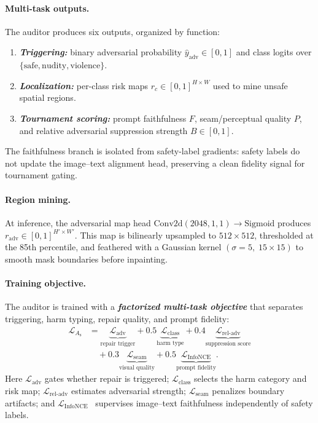 \documentclass[11pt]{article}
\newcommand{\As}{A_{\mathrm{s}}}
\begin{document}
\paragraph{Multi-task outputs.}
The auditor produces six outputs, organized by function:
\begin{enumerate}[leftmargin=1.5em,itemsep=2pt,topsep=2pt]
  \item \textbf{\emph{Triggering:}} binary adversarial probability
  $\hat y_{\mathrm{adv}}\in[0,1]$ and class logits over
  $\{\mathrm{safe},\mathrm{nudity},\mathrm{violence}\}$.
  \item \textbf{\emph{Localization:}} per-class risk maps
  $r_c\in[0,1]^{H\times W}$ used to mine unsafe spatial regions.
  \item \textbf{\emph{Tournament scoring:}} prompt faithfulness $F$,
  seam/perceptual quality $P$, and relative adversarial suppression strength
  $B\in[0,1]$.
\end{enumerate}
The faithfulness branch is isolated from safety-label gradients: safety labels
do not update the image--text alignment head, preserving a clean fidelity
signal for tournament gating.

\paragraph{Region mining.}
At inference, the adversarial map head
$\mathrm{Conv2d}(2048,1,1)\!\to\!\mathrm{Sigmoid}$ produces
$r_{\mathrm{adv}}\in[0,1]^{H'\times W'}$. This map is bilinearly upsampled to
$512\times512$, thresholded at the 85th percentile, and feathered with a
Gaussian kernel $(\sigma=5,\;15\times15)$ to smooth mask boundaries before
inpainting.

\paragraph{Training objective.}
The auditor is trained with a \textbf{\emph{factorized multi-task objective}}
that separates triggering, harm typing, repair quality, and prompt fidelity:
\begin{align*}
\mathcal{L}_{\As}
&=
\underbrace{\mathcal{L}_{\mathrm{adv}}}_{\text{repair trigger}}
+
0.5\underbrace{\mathcal{L}_{\mathrm{class}}}_{\text{harm type}}
+
0.4\underbrace{\mathcal{L}_{\mathrm{rel\text{-}adv}}}_{\text{suppression score}}
\\[-0.15em]
&\quad+
0.3\underbrace{\mathcal{L}_{\mathrm{seam}}}_{\text{visual quality}}
+
0.5\underbrace{\mathcal{L}_{\mathrm{InfoNCE}}}_{\text{prompt fidelity}} .
\end{align*}
Here $\mathcal{L}_{\mathrm{adv}}$ gates whether repair is triggered;
$\mathcal{L}_{\mathrm{class}}$ selects the harm category and risk map;
$\mathcal{L}_{\mathrm{rel\text{-}adv}}$ estimates adversarial strength;
$\mathcal{L}_{\mathrm{seam}}$ penalizes boundary artifacts; and
$\mathcal{L}_{\mathrm{InfoNCE}}$~\cite{oord2018cpc} supervises image--text
faithfulness independently of safety labels.
\end{document}

